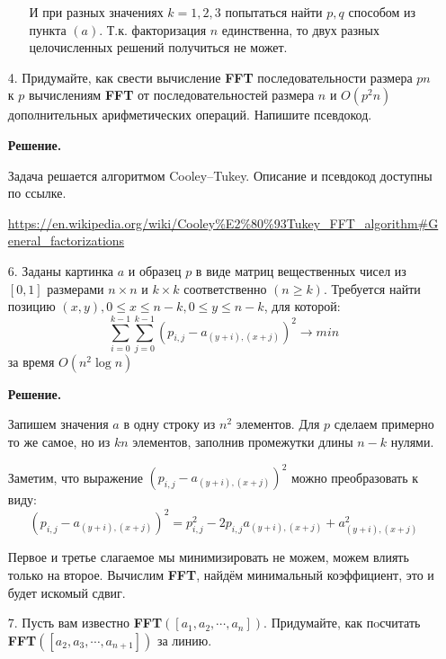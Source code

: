 \begin{enumerate}
\begin{enumerate}
		И при разных значениях $k = 1, 2, 3$ попытаться найти $p,q$ способом из пункта $(a)$. Т.к. факторизация $n$ единственна, то двух разных целочисленных решений получиться не может.
		
	\end{enumerate}
	
	\item[4.] Придумайте, как свести вычисление \textbf{FFT} последовательности размера $pn$ к $p$ вычислениям 
	\textbf{FFT} от	последовательностей размера $n$ и $O(p^2n)$ дополнительных арифметических операций. Напишите 
	псевдокод.
	
	\textbf{Решение.}
	
	Задача решается алгоритмом Cooley–Tukey. Описание и псевдокод доступны по ссылке.
	
	\url{https://en.wikipedia.org/wiki/Cooley%E2%80%93Tukey_FFT_algorithm#General_factorizations}
	
	\item[6.] Заданы картинка $a$ и образец $p$ в виде матриц вещественных чисел из $[0, 1]$ размерами $n \times n$ 
	и $k \times k$ соответственно $(n \geqslant k)$. Требуется найти позицию $(x, y), 0 \leqslant x \leqslant n - 
	k, 0 \leqslant y \leqslant n - k$, для которой:
	\begin{equation*}
		\sum\limits_{i = 0}^{k - 1} \sum\limits_{j = 0}^{k - 1} (p_{i,j} - a_{(y + i), (x + j)})^2 \rightarrow min
	\end{equation*}
	за время $O(n^2\log n)$
	
	\textbf{Решение.}
	
	Запишем значения $a$ в одну строку из $n^2$ элементов. Для $p$ сделаем примерно то же самое, но из $kn$ элементов, заполнив промежутки длины $n - k$ нулями. 
	
	Заметим, что выражение $(p_{i,j} - a_{(y + i), (x + j)})^2$ можно преобразовать к виду:
	\begin{equation*}
		(p_{i,j} - a_{(y + i), (x + j)})^2 = p_{i,j}^2 - 2 p_{i,j}a_{(y + i), (x + j)} + a_{(y + i), (x + j)}^2
	\end{equation*}
	
	Первое и третье слагаемое мы минимизировать не можем, можем влиять только на второе. Вычислим \textbf{FFT}, найдём минимальный коэффициент, это и будет искомый сдвиг.
	
	\item[7.] Пусть вам известно \textbf{FFT}$([a_1, a_2, \cdots , a_n])$. Придумайте, как пoсчитать 
	\textbf{FFT}$([a_2, a_3, \cdots , a_{n+1}])$ за линию.
	

\end{enumerate}
